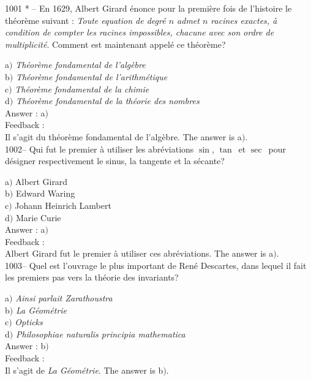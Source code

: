 \documentclass[letterpaper, 12pt]{article}
\begin{document}
1001 * -- En 1629, Albert Girard \'enonce pour la premi\`ere fois de
l'histoire le th\'eor\`eme suivant : {\sl Toute equation de
degr\'e $n$ admet $n$ racines exactes, \`a condition de compter les
racines impossibles, chacune avec son ordre de multiplicit\'e}.
Comment est maintenant appel\'e ce th\'eor\`eme?

a$)$ {\sl Th\'eor\`eme fondamental de l'alg\`ebre} \\
b$)$ {\sl Th\'eor\`eme fondamental de l'arithm\'etique} \\
c$)$ {\sl Th\'eor\`eme fondamental de la chimie} \\
d$)$ {\sl Th\'eor\`eme fondamental de la th\'eorie des nombres}\\

Answer : a$)$\\

Feedback : \\
Il s'agit du th\'eor\`eme fondamental de l'alg\`ebre.
The answer is a$)$.\\

1002-- Qui fut le premier \`a utiliser les abr\'eviations
\og$\sin$\fg, \og$\tan$\fg\ et \og$\sec$\fg\ pour d\'esigner
respectivement le sinus, la tangente et la s\'ecante?

a$)$ Albert Girard \\
b$)$ Edward Waring \\
c$)$ Johann Heinrich Lambert \\
d$)$ Marie Curie\\

Answer : a$)$\\

Feedback : \\
Albert Girard fut le premier \`a utiliser ces abr\'eviations.
The answer is a$)$.\\

1003-- Quel est l'ouvrage le plus important de Ren\'e Descartes,
dans lequel il fait les premiers pas vers la th\'eorie des
invariants?

a$)$ {\sl Ainsi parlait Zarathoustra} \\
b$)$ {\sl La G\'eom\'etrie} \\
c$)$ {\sl Opticks} \\
d$)$ {\sl Philosophiae naturalis principia mathematica}\\

Answer : b$)$\\

Feedback : \\
Il s'agit de {\sl La G\'eom\'etrie}.
The answer is b$)$.\\
\end{document}

